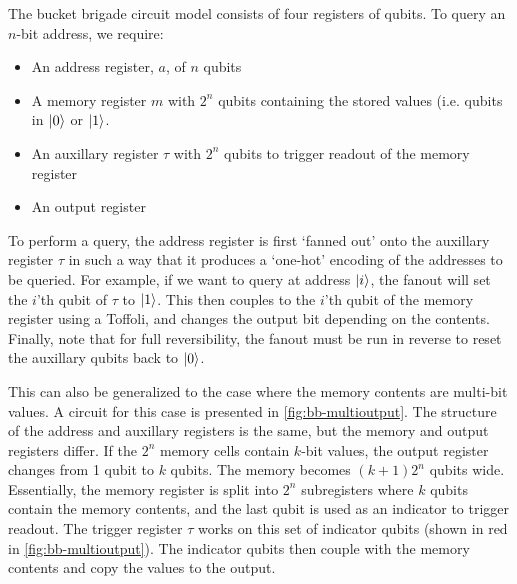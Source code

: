 \documentclass[a4paper,12pt]{article}
\begin{document}
{{The bucket brigade circuit model consists of four registers of qubits. To query an $n$-bit address, we require:
\begin{itemize}
 \item An address register, $a$, of $n$ qubits
 \item A memory register $m$ with $2^n$ qubits containing the stored values (i.e. qubits in $\ket{0}$ or $\ket{1}$.
 \item An auxillary register $\tau$ with $2^n$ qubits to trigger readout of the memory register
 \item An output register
\end{itemize}

To perform a query, the address register is first `fanned out' onto the auxillary register $\tau$ in such a way that it produces a `one-hot' encoding of the addresses to be queried. For example, if we want to query at address $\ket{i}$, the fanout will set the $i$'th qubit of $\tau$ to $\ket{1}$. This then couples to the $i$'th qubit of the memory register using a Toffoli, and changes the output bit depending on the contents. Finally, note that for full reversibility, the fanout must be run in reverse to reset the auxillary qubits back to $\ket{0}$. 

This can also be generalized to the case where the memory contents are multi-bit values. A circuit for this case is presented in \autoref{fig:bb-multioutput}. The structure of the address and auxillary registers is the same, but the memory and output registers differ. If the $2^n$ memory cells contain $k$-bit values, the output register changes from 1 qubit to $k$ qubits.  The memory becomes $(k+1)2^n$ qubits wide. Essentially, the memory register is split into $2^n$ subregisters where $k$ qubits contain the memory contents, and the last qubit is used as an indicator to trigger readout. The trigger register $\tau$ works on this set of indicator qubits (shown in red in \autoref{fig:bb-multioutput}). The indicator qubits then couple with the memory contents and copy the values to the output.

}}
\end{document}
